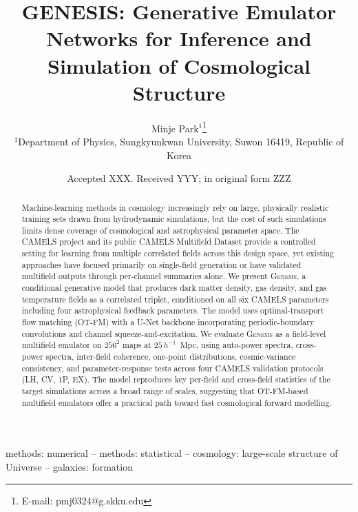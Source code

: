 \documentclass[usenatbib]{mnras}
\title[GENESIS: Cosmological Structure Emulation]{%
GENESIS: Generative Emulator Networks for Inference and Simulation of
Cosmological Structure}
\author[M. Park]{%
Minje Park$^{1}$\thanks{E-mail: pmj0324@g.skku.edu}
\\
$^{1}$Department of Physics, Sungkyunkwan University, Suwon 16419, Republic of Korea
}
\date{Accepted XXX. Received YYY; in original form ZZZ}
\begin{document}
\label{firstpage}
\pagerange{\pageref{firstpage}--\pageref{lastpage}}
\maketitle

\begin{abstract}
Machine-learning methods in cosmology increasingly rely on large,
physically realistic training sets drawn from hydrodynamic simulations,
but the cost of such simulations limits dense coverage of cosmological
and astrophysical parameter space.
The CAMELS project and its public CAMELS Multifield Dataset provide a
controlled setting for learning from multiple correlated fields across
this design space, yet existing approaches have focused primarily on
single-field generation or have validated multifield outputs through
per-channel summaries alone.
We present \textsc{Genesis}, a conditional generative model that
produces dark matter density, gas density, and gas temperature fields
as a correlated triplet, conditioned on all six CAMELS parameters
including four astrophysical feedback parameters.
The model uses optimal-transport flow matching (OT-FM) with a U-Net backbone
incorporating periodic-boundary convolutions and channel
squeeze-and-excitation.
We evaluate \textsc{Genesis} as a field-level multifield emulator on
$256^2$ maps at $25\,h^{-1}$~Mpc, using auto-power spectra,
cross-power spectra, inter-field coherence, one-point distributions,
cosmic-variance consistency, and parameter-response tests across four
CAMELS validation protocols (LH, CV, 1P, EX).
The model reproduces key per-field and cross-field statistics of the
target simulations across a broad range of scales, suggesting that
OT-FM-based multifield emulators offer a practical path toward
fast cosmological forward modelling.
\end{abstract}

\begin{keywords}
methods: numerical -- methods: statistical --
cosmology: large-scale structure of Universe -- galaxies: formation
\end{keywords}



\end{document}
